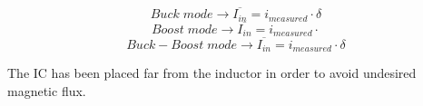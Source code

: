 \begin{equation} 
	Buck \; mode \rightarrow \overline{I_{in}} = i_{measured} \cdot \delta
\end{equation}
\begin{equation} 
Boost \; mode \rightarrow \overline{I_{in}} = i_{measured} \cdot
\end{equation}
\begin{equation} 
Buck-Boost \; mode \rightarrow \overline{I_{in}} = i_{measured} \cdot \delta
\end{equation}

The IC has been placed far from the inductor in order to avoid undesired magnetic flux.

